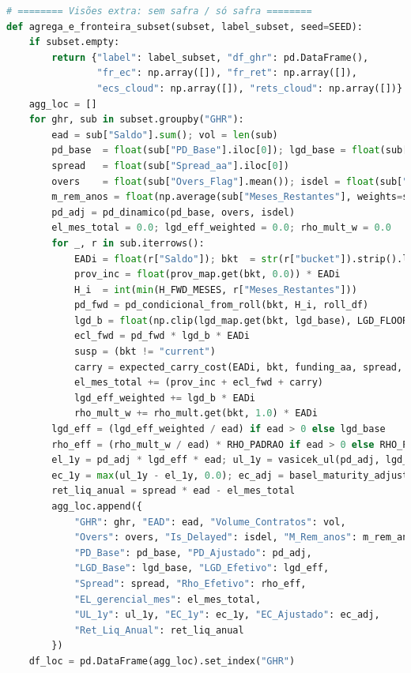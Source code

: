 \documentclass[11pt,a4paper]{article}
\newcommand{\1}{\mathbf{1}}
\begin{document}
\begin{lstlisting}[language=Python, caption={risk_frontier.py (versão completa com normalização por prazo e visões)}]
# ======== Visões extra: sem safra / só safra ========
def agrega_e_fronteira_subset(subset, label_subset, seed=SEED):
    if subset.empty:
        return {"label": label_subset, "df_ghr": pd.DataFrame(),
                "fr_ec": np.array([]), "fr_ret": np.array([]),
                "ecs_cloud": np.array([]), "rets_cloud": np.array([])}
    agg_loc = []
    for ghr, sub in subset.groupby("GHR"):
        ead = sub["Saldo"].sum(); vol = len(sub)
        pd_base  = float(sub["PD_Base"].iloc[0]); lgd_base = float(sub["LGD_Base"].iloc[0])
        spread   = float(sub["Spread_aa"].iloc[0])
        overs    = float(sub["Overs_Flag"].mean()); isdel = float(sub["IsDelayed_Flag"].mean())
        m_rem_anos = float(np.average(sub["Meses_Restantes"], weights=sub["Saldo"]) / 12.0) if ead > 0 else 0.0
        pd_adj = pd_dinamico(pd_base, overs, isdel)
        el_mes_total = 0.0; lgd_eff_weighted = 0.0; rho_mult_w = 0.0
        for _, r in sub.iterrows():
            EADi = float(r["Saldo"]); bkt  = str(r["bucket"]).strip().lower()
            prov_inc = float(prov_map.get(bkt, 0.0)) * EADi
            H_i  = int(min(H_FWD_MESES, r["Meses_Restantes"]))
            pd_fwd = pd_condicional_from_roll(bkt, H_i, roll_df)
            lgd_b = float(np.clip(lgd_map.get(bkt, lgd_base), LGD_FLOOR, LGD_CAP))
            ecl_fwd = pd_fwd * lgd_b * EADi
            susp = (bkt != "current")
            carry = expected_carry_cost(EADi, bkt, funding_aa, spread, months=H_i, opex_map=opex_map, suspende_accrual=susp)
            el_mes_total += (prov_inc + ecl_fwd + carry)
            lgd_eff_weighted += lgd_b * EADi
            rho_mult_w += rho_mult.get(bkt, 1.0) * EADi
        lgd_eff = (lgd_eff_weighted / ead) if ead > 0 else lgd_base
        rho_eff = (rho_mult_w / ead) * RHO_PADRAO if ead > 0 else RHO_PADRAO
        el_1y = pd_adj * lgd_eff * ead; ul_1y = vasicek_ul(pd_adj, lgd_eff, ead, rho_eff, Z_ALPHA)
        ec_1y = max(ul_1y - el_1y, 0.0); ec_adj = basel_maturity_adjustment(pd_adj, ec_1y, m_rem_anos)
        ret_liq_anual = spread * ead - el_mes_total
        agg_loc.append({
            "GHR": ghr, "EAD": ead, "Volume_Contratos": vol,
            "Overs": overs, "Is_Delayed": isdel, "M_Rem_anos": m_rem_anos,
            "PD_Base": pd_base, "PD_Ajustado": pd_adj,
            "LGD_Base": lgd_base, "LGD_Efetivo": lgd_eff,
            "Spread": spread, "Rho_Efetivo": rho_eff,
            "EL_gerencial_mes": el_mes_total,
            "UL_1y": ul_1y, "EC_1y": ec_1y, "EC_Ajustado": ec_adj,
            "Ret_Liq_Anual": ret_liq_anual
        })
    df_loc = pd.DataFrame(agg_loc).set_index("GHR")

\end{lstlisting}
\end{document}
